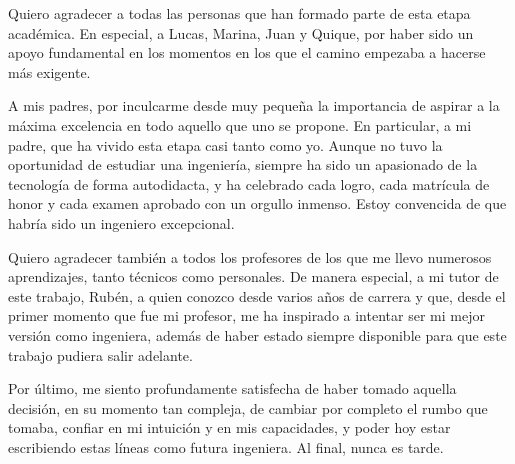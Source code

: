 
\pagestyle{fancy}



Quiero agradecer a todas las personas que han formado parte de esta etapa académica. En especial, a Lucas, Marina, Juan y Quique, por haber sido un apoyo fundamental en los momentos en los que el camino empezaba a hacerse más exigente.

A mis padres, por inculcarme desde muy pequeña la importancia de aspirar a la máxima excelencia en todo aquello que uno se propone. En particular, a mi padre, que ha vivido esta etapa casi tanto como yo. Aunque no tuvo la oportunidad de estudiar una ingeniería, siempre ha sido un apasionado de la tecnología de forma autodidacta, y ha celebrado cada logro, cada matrícula de honor y cada examen aprobado con un orgullo inmenso. Estoy convencida de que habría sido un ingeniero excepcional.

Quiero agradecer también a todos los profesores de los que me llevo numerosos aprendizajes, tanto técnicos como personales. De manera especial, a mi tutor de este trabajo, Rubén, a quien conozco desde varios años de carrera y que, desde el primer momento que fue mi profesor, me ha inspirado a intentar ser mi mejor versión como ingeniera, además de haber estado siempre disponible para que este trabajo pudiera salir adelante.

Por último, me siento profundamente satisfecha de haber tomado aquella decisión, en su momento tan compleja, de cambiar por completo el rumbo que tomaba, confiar en mi intuición y en mis capacidades, y poder hoy estar escribiendo estas líneas como futura ingeniera. Al final, nunca es tarde.


\chapterend


\blankpage
